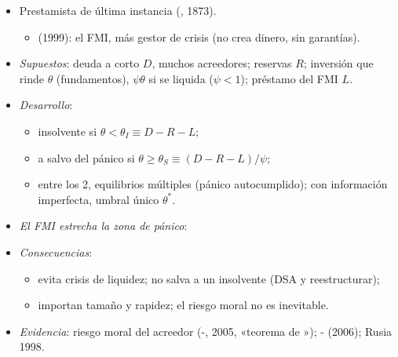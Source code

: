 \documentclass{article}
\begin{document}
\begin{columnas}
\begin{itemize}
\item Prestamista de última instancia (, 1873).
  \begin{itemize}
  \item {} (1999): el FMI, más gestor de crisis (no crea dinero, sin garantías).
  \end{itemize}
\end{itemize}
\begin{itemize}
\item \emph{Supuestos}: deuda a corto $D$, muchos acreedores; reservas $R$; inversión que rinde $\theta$ (fundamentos), $\psi\theta$ si se liquida ($\psi<1$); préstamo del FMI $L$.
\item \emph{Desarrollo}:
  \begin{itemize}
  \item insolvente si $\theta<\theta_I\equiv D-R-L$;
  \item a salvo del pánico si $\theta\geq\theta_S\equiv(D-R-L)/\psi$;
  \item entre los 2, equilibrios múltiples (pánico autocumplido); con información imperfecta, umbral único $\theta^*$.
  \end{itemize}
\item \emph{El FMI estrecha la zona de pánico}:
\end{itemize}
\begin{itemize}
\item \emph{Consecuencias}:
  \begin{itemize}
  \item evita crisis de liquidez; no salva a un insolvente (DSA y reestructurar);
  \item importan tamaño y rapidez; el riesgo moral no es inevitable.
  \end{itemize}
\item \emph{Evidencia}: riesgo moral del acreedor (-, 2005, «teorema de »); - (2006); Rusia 1998.
\end{itemize}


\end{columnas}
\end{document}
